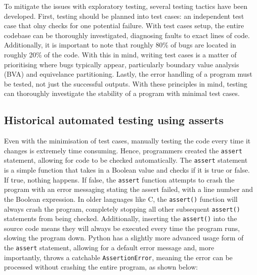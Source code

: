 \documentclass[11pt]{article}
\begin{document}
To mitigate the issues with exploratory testing, several testing tactics have been developed. First, testing should be planned into test cases: an independent test case that olny checks for one potential failure. With test cases setup, the entire codebase can be thoroughly investigated, diagnosing faults to exact lines of code. Additionally, it is important to note that roughly 80\% of bugs are located in roughly 20\% of the code. With this in mind, writing test cases is a matter of prioritising where bugs typically appear, particularly boundary value analysis (BVA) and equivelance partitioning. Lastly, the error handling of a program must be tested, not just the successful outputs. With these principles in mind, testing can thoroughly investigate the stability of a program with minimal test cases.

\subsection{Historical automated testing using asserts}

Even with the minimisation of test cases, manually testing the code every time it changes is extremely time consuming. Hence, programmers created the \texttt{assert} statement, allowing for code to be checked automatically. The \texttt{assert} statement is a simple function that takes in a Boolean value and checks if it is true or false. If true, nothing happens. If false, the \texttt{assert} function attempts to crash the program with an error messaging stating the assert failed, with a line number and the Boolean expression. In older languages like C, the \texttt{assert()} function will always crash the program, completely stopping all other subsequent \texttt{assert()} statements from being checked. Additionally, inserting the \texttt{assert()} into the source code means they will always be executed every time the program runs, slowing the program down. Python has a slightly more advanced usage form of the \texttt{assert} statement, allowing for a default error message and, more importantly, throws a catchable \texttt{AssertionError}, meaning the error can be processed without crashing the entire program, as shown below:

\inputminted[linenos=true]{python}{python_examples/assert_example.py}
\end{document}
